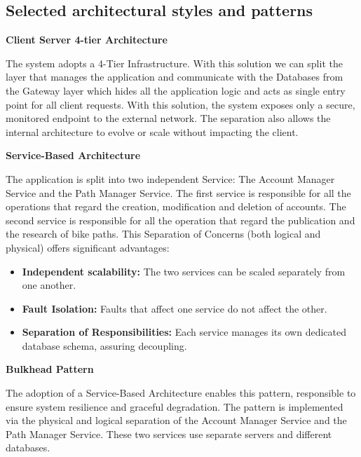 \subsection{Selected architectural styles and patterns}

\textbf{Client Server 4-tier Architecture}\newline

\noindent The system adopts a 4-Tier Infrastructure. With this solution we can split the
layer that manages the application and communicate with the Databases from the Gateway layer
which hides all the application logic and acts as single entry point for all client requests.
With this solution, the system exposes only a secure, monitored endpoint to the external network.
The separation also allows the internal architecture to evolve or scale without impacting the client. \newline

\noindent\textbf{Service-Based Architecture}\newline

\noindent The application is split into two independent Service: The Account Manager Service and the Path Manager Service.
The first service is responsible for all the operations that regard the creation, modification and deletion of accounts.
The second service is responsible for all the operation that regard the publication and the research of bike paths. This 
Separation of Concerns (both logical and physical) offers significant advantages:
\begin{itemize}
    \item \textbf{Independent scalability:} The two services can be scaled separately from one another.
    \item \textbf{Fault Isolation:} Faults that affect one service do not affect the other.
    \item \textbf{Separation of Responsibilities:} Each service manages its own dedicated database schema, assuring decoupling. 
\end{itemize} 
\noindent
\textbf{Bulkhead Pattern} \newline

\noindent The adoption of a Service-Based Architecture enables this pattern, responsible to ensure system resilience and graceful degradation.
The pattern is implemented via the physical and logical separation of the Account Manager Service and the Path Manager Service.
These two services use separate servers and different databases.\newpage

